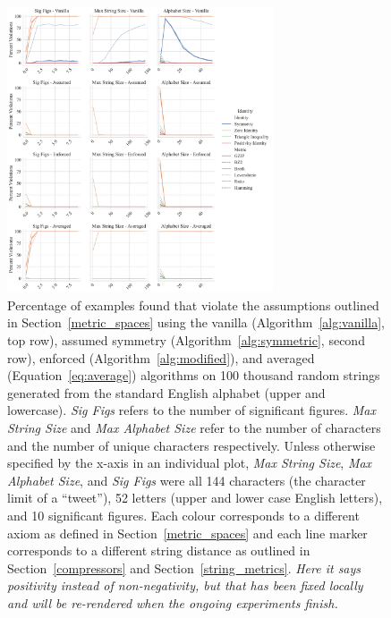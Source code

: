 \documentclass[preprint,12pt]{article}
\newcommand{\cm}[1]{\textit{{\color{blue}#1}}}
\begin{document}
\begin{figure}[h!]
    \centering
    \includegraphics[width=0.70\textwidth]{images/synthetic_check.pdf}
    \caption{
    Percentage of examples found that violate the assumptions outlined in Section~\ref{metric_spaces} using the vanilla (Algorithm~\ref{alg:vanilla}, top row), assumed symmetry (Algorithm~\ref{alg:symmetric}, second row), enforced (Algorithm~\ref{alg:modified}), and averaged (Equation~\ref{eq:average}) algorithms on 100 thousand random strings generated from the standard English alphabet (upper and lowercase). 
    \textit{Sig Figs} refers to the number of significant figures. \textit{Max String Size} and \textit{Max Alphabet Size} refer to the number of characters and the number of unique characters respectively. 
    Unless otherwise specified by the x-axis in an individual plot, \textit{Max String Size}, \textit{Max Alphabet Size}, and \textit{Sig Figs} were all 144 characters (the character limit of a ``tweet''), 52 letters (upper and lower case English letters), and 10 significant figures. Each colour corresponds to a different axiom as defined in Section~\ref{metric_spaces} and each line marker corresponds to a different string distance as outlined in Section~\ref{compressors} and Section~\ref{string_metrics}. \cm{Here it says positivity instead of non-negativity, but that has been fixed locally and will be re-rendered when the ongoing experiments finish.}
    }
    \label{fig:synthetic_check}
\end{figure}
\end{document}
